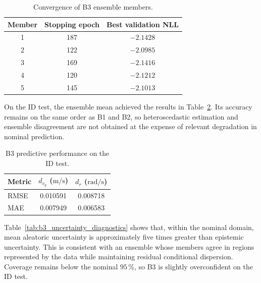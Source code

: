 \documentclass[12pt,a4paper]{report}
\begin{document}
\begin{table}[htbp]
    \centering
    \caption{Convergence of B3 ensemble members.}
    \label{tab:b3_member_training}
    \begin{tabular}{@{}ccc@{}}
        \toprule
        Member & Stopping epoch & Best validation NLL \\
        \midrule
        1 & 187 & $-2.1428$ \\
        2 & 122 & $-2.0985$ \\
        3 & 169 & $-2.1416$ \\
        4 & 120 & $-2.1212$ \\
        5 & 145 & $-2.1013$ \\
        \bottomrule
    \end{tabular}
\end{table}

On the ID test, the ensemble mean achieved the results in Table~\ref{tab:b3_predictive_performance}. Its accuracy remains on the same order as B1 and B2, so heteroscedastic estimation and ensemble disagreement are not obtained at the expense of relevant degradation in nominal prediction.

\begin{table}[htbp]
    \centering
    \caption{B3 predictive performance on the ID test.}
    \label{tab:b3_predictive_performance}
    \begin{tabular}{@{}lcc@{}}
        \toprule
        Metric & $d_{v_y}$ ($\mathrm{m/s}$) & $d_r$ ($\mathrm{rad/s}$) \\
        \midrule
        RMSE & 0.010591 & 0.008718 \\
        MAE  & 0.007949 & 0.006583 \\
        \bottomrule
    \end{tabular}
\end{table}

Table~\ref{tab:b3_uncertainty_diagnostics} shows that, within the nominal domain, mean aleatoric uncertainty is approximately five times greater than epistemic uncertainty. This is consistent with an ensemble whose members agree in regions represented by the data while maintaining residual conditional dispersion. Coverage remains below the nominal $95$\,\%, so B3 is slightly overconfident on the ID test.
\end{document}
